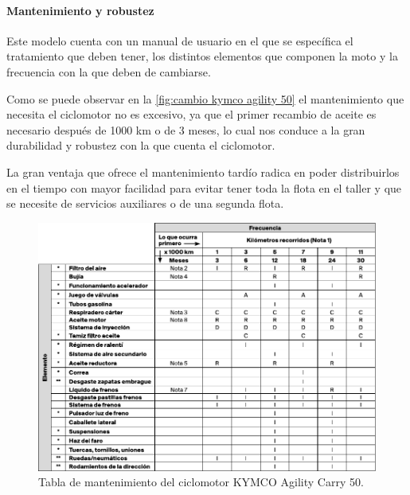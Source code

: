 \paragraph{Mantenimiento y robustez}

Este modelo cuenta con un manual de usuario \cite{manualkymcociclomotor} en el que se específica el tratamiento que deben tener, los distintos elementos que componen la moto y la frecuencia con la que deben de cambiarse. 

Como se puede observar en la \autoref{fig:cambio kymco agility 50} el mantenimiento que necesita el ciclomotor no es excesivo, ya que el primer recambio de aceite es necesario después de 1000 \gls{km} o de 3 meses, lo cual nos conduce a la gran durabilidad y robustez con la que cuenta el ciclomotor.

La gran ventaja que ofrece el mantenimiento tardío radica en poder distribuirlos en el tiempo con mayor facilidad para evitar tener toda la flota en el taller y que se necesite de servicios auxiliares o de una segunda flota.

\begin{figure}[h]
    \centering
    \includegraphics[scale = 1]{archivos/ManualUsuario_AgilityCity50.pdf}
    \caption{Tabla de mantenimiento del ciclomotor  KYMCO Agility Carry 50.}
    \label{fig:cambio kymco agility 50}
\end{figure}

